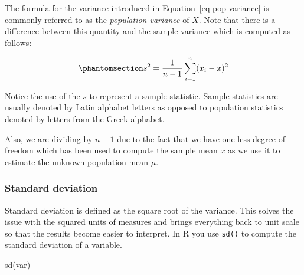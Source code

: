 \documentclass[
  letterpaper,
  DIV=11,
  numbers=noendperiod]{scrartcl}
\newenvironment{Shaded}{\begin{snugshade}}{\end{snugshade}}
\newcommand{\FunctionTok}[1]{\textcolor[rgb]{0.28,0.35,0.67}{#1}}
\newcommand{\NormalTok}[1]{\textcolor[rgb]{0.00,0.23,0.31}{#1}}
\begin{document}
\begin{tcolorbox}[enhanced jigsaw, colframe=quarto-callout-note-color-frame, toptitle=1mm, colbacktitle=quarto-callout-note-color!10!white, opacitybacktitle=0.6, bottomtitle=1mm, opacityback=0, left=2mm, coltitle=black, breakable, titlerule=0mm, title=\textcolor{quarto-callout-note-color}{\faInfo}\hspace{0.5em}{Note}, colback=white, arc=.35mm, rightrule=.15mm, bottomrule=.15mm, leftrule=.75mm, toprule=.15mm]

The formula for the variance introduced in
Equation~\ref{eq-pop-variance} is commonly referred to as the
\emph{population variance} of \(X\). Note that there is a difference
between this quantity and the sample variance which is computed as
follows:

\begin{equation}\phantomsection\label{eq-sample-var}{
s^2 = \frac{1}{n-1} \sum_{i=1}^n (x_i - \bar{x})^2
}\end{equation}

Notice the use of the \(s\) to represent a
\href{https://www.sciencedirect.com/topics/mathematics/sample-statistic}{sample
statistic}. Sample statistics are usually denoted by Latin alphabet
letters as opposed to population statistics denoted by letters from the
Greek alphabet.

Also, we are dividing by \(n-1\) due to the fact that we have one less
degree of freedom which has been used to compute the sample mean
\(\bar{x}\) as we use it to estimate the unknown population mean
\(\mu\).

\end{tcolorbox}

\subsubsection{Standard deviation}\label{standard-deviation}

Standard deviation is defined as the square root of the variance. This
solves the issue with the squared units of measures and brings
everything back to unit scale so that the results become easier to
interpret. In R you use \texttt{sd()} to compute the standard deviation
of a variable.

\begin{Shaded}
\begin{Highlighting}[]
\FunctionTok{sd}\NormalTok{(var)}
\end{Highlighting}
\end{Shaded}
\end{document}
